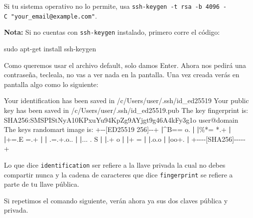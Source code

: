 \documentclass[
  spanish,
  12pt,
  letterpaper,
  DIV=11,
  numbers=noendperiod]{scrreprt}
\newenvironment{Shaded}{\begin{snugshade}}{\end{snugshade}}
\newcommand{\BuiltInTok}[1]{\textcolor[rgb]{0.00,0.23,0.31}{#1}}
\newcommand{\ExtensionTok}[1]{\textcolor[rgb]{0.00,0.23,0.31}{#1}}
\newcommand{\FunctionTok}[1]{\textcolor[rgb]{0.28,0.35,0.67}{#1}}
\newcommand{\KeywordTok}[1]{\textcolor[rgb]{0.00,0.23,0.31}{\textbf{#1}}}
\newcommand{\NormalTok}[1]{\textcolor[rgb]{0.00,0.23,0.31}{#1}}
\newcommand{\PreprocessorTok}[1]{\textcolor[rgb]{0.68,0.00,0.00}{#1}}
\begin{document}
Si tu sistema operativo no lo permite, usa
\texttt{ssh-keygen\ -t\ rsa\ -b\ 4096\ -C\ "your\_email@example.com"}.

\textbf{Nota:} Si no cuentas con \texttt{ssh-keygen} instalado, primero
corre el código:

\begin{Shaded}
\begin{Highlighting}[]
\FunctionTok{sudo}\NormalTok{ apt{-}get install ssh{-}keygen}
\end{Highlighting}
\end{Shaded}

Como queremos usar el archivo default, solo damos Enter. Ahora nos
pedirá una contraseña, tecleala, no vas a ver nada en la pantalla. Una
vez creada verás en pantalla algo como lo siguiente:

\begin{Shaded}
\begin{Highlighting}[]
\ExtensionTok{Your}\NormalTok{ identification has been saved in /c/Users/user/.ssh/id\_ed25519}
\ExtensionTok{Your}\NormalTok{ public key has been saved in /c/Users/user/.ssh/id\_ed25519.pub}
\ExtensionTok{The}\NormalTok{ key fingerprint is:}
\ExtensionTok{SHA256:SMSPIStNyA10KPxuYu94KpZg9AYjgt9g46A4kFy3g1o}\NormalTok{ user@domain}
\ExtensionTok{The}\NormalTok{ keys randomart image is:}
\ExtensionTok{+{-}{-}[ED25519}\NormalTok{ 256]{-}{-}+}
\KeywordTok{|}\ExtensionTok{\^{}B==}\NormalTok{ o.          }\KeywordTok{|}
\KeywordTok{|}\ExtensionTok{\%*=} \PreprocessorTok{*}\NormalTok{.+          }\KeywordTok{|}
\KeywordTok{|}\ExtensionTok{+=.E}\NormalTok{ =.+         }\KeywordTok{|}
\KeywordTok{|} \BuiltInTok{.}\NormalTok{=.+.o..        }\KeywordTok{|}
\KeywordTok{|}\ExtensionTok{...}\NormalTok{   . S        }\KeywordTok{|}
\KeywordTok{|}\BuiltInTok{.}\NormalTok{+ o             }\KeywordTok{|}
\KeywordTok{|}\ExtensionTok{+}\NormalTok{ =              }\KeywordTok{|}
\KeywordTok{|}\ExtensionTok{.o.o}             \KeywordTok{|}
\KeywordTok{|}\ExtensionTok{oo+.}             \KeywordTok{|}
\ExtensionTok{+{-}{-}{-}{-}[SHA256]{-}{-}{-}{-}{-}+}
\end{Highlighting}
\end{Shaded}

Lo que dice \texttt{identification} ser refiere a la llave privada la
cual no debes compartir nunca y la cadena de caracteres que dice
\texttt{fingerprint} se refiere a parte de tu llave pública.

Si repetimos el comando siguiente, verán ahora ya sus dos claves pública
y privada.
\end{document}
